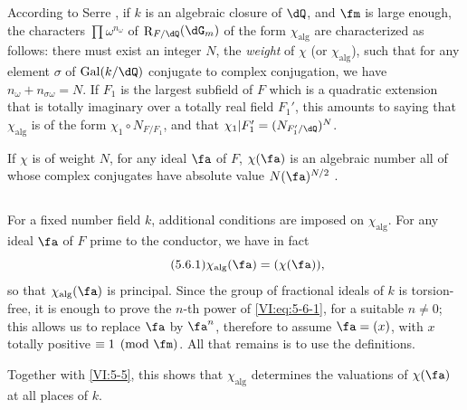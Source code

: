 \documentclass[oneside]{book}
\DeclareMathOperator{\gal}{Gal}
\DeclareMathOperator{\res}{R} %
\newcounter{char}
\theoremstyle{sga-source}
\theoremstyle{sga-source-dash}
\theoremstyle{sga-source-dotdash}
\theoremstyle{sga-source-number-note-dash}
\theoremstyle{sga-source-note-number-dotdash}
\theoremstyle{sga-source-example-dotdash}
\theoremstyle{sga-source-inline-number}
\theoremstyle{sga-source-bare-number}
\theoremstyle{sga-source}
\newcommand{\PrintPage}[1]{}\newcommand{\MathPage}[1]{}\newcommand{\PrintCite}[2]{#1}\newcommand{\var}[3]{#2}
\begin{document}
According to Serre \cite[II.3]{se68}, if $k$ is an algebraic closure of 
$\dQ$, and $\fm$ is large enough, the characters $\prod \omega^{n_\omega}$ 
of $\res_{F/\dQ}(\dG_m)$ of the form $\chi_\text{alg}$ are characterized 
as follows: there must exist an integer $N$, the \emph{weight} of $\chi$ (or 
$\chi_\text{alg}$), such that for any element $\sigma$ of $\gal(k/\dQ)$ 
conjugate to complex conjugation, we have $n_\omega+n_{\sigma \omega}=N$. If 
$F_1$ is the largest subfield of $F$ which is a quadratic extension 
that is totally imaginary over a totally real field $F_1'$, this amounts to 
  saying that $\chi_\text{alg}$ is of the form $\chi_1\circ N_{F/F_1}$, and that 
  $\var{\chi_1|F_1=(N_{F_1/\dQ})^N}{\chi_1|F_1'=(N_{F_1'/\dQ})^N}{S45-SOL-0879}$. 

If $\chi$ is of weight $N$, for any ideal $\fa$ of $F$, $\chi(\fa)$ is an algebraic number all of whose complex conjugates have absolute value 
$N(\fa)^{N/2}$ \cite[II.3 prop.2]{se68}. 





\subsection{}\label{VI:5-6}

For a fixed number field $k$, additional conditions are 
imposed on $\chi_\text{alg}$. For any ideal $\fa$ of $F$ prime to the 
conductor, we have in fact 
\begin{equation*}\tag{5.6.1}\label{VI:eq:5-6-1}
  \chi_\text{alg}(\fa) = (\chi(\fa)) \text{,} 
\end{equation*}
so that $\chi_\text{alg}(\fa)$ is principal. Since the group of fractional ideals of \var{$k$ has torsion}{$k$ is torsion-free}{S45-SOL-0882}, it is enough to prove the $n$-th power 
of \eqref{VI:eq:5-6-1}, for a suitable $n\ne 0$; this allows us 
to replace $\fa$ by $\fa^n$, therefore to assume $\fa=(x)$, with $x$ totally 
positive $\equiv 1\pmod\fm$. All that remains is to use the definitions. 

\PrintPage{211}
Together with \ref{VI:5-5}, this shows that $\chi_\text{alg}$ determines the 
valuations of $\chi(\fa)$ at all places of $k$. 





\subsection{}\label{VI:5-7}
\end{document}
